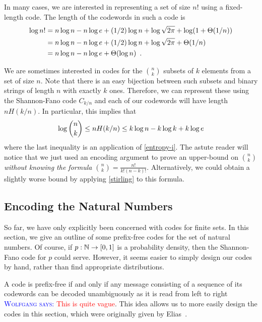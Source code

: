 \documentclass{patmorin}
\newcommand{\aremark}[3]{\textcolor{blue}{\textsc{#1 #2:}}
  \textcolor{red}{\textsf{#3}}}
\newcommand{\wolfgang}[2][says]{\aremark{Wolfgang}{#1}{#2}}
\begin{document}
In many cases, we are interested in representing a set of size $n!$
using a fixed-length code.  The length of the codewords in such a code
is
\begin{align}
  \log n!
  & = n\log n - n\log e + (1/2)\log n + \log \sqrt{2 \pi} + \log(1+\Theta(1/n)) \notag \\
  & = n\log n - n\log e + (1/2)\log n + \log \sqrt{2 \pi} + \Theta(1/n) \notag \\
  & = n\log n - n\log e + \Theta(\log n) \eqlabel{stirling-loose}
    \enspace .
\end{align}

We are sometimes interested in codes for the $\binom{n}{k}$ subsets of
$k$ elements from a set of size $n$. Note that there is an easy
bijection between such subsets and binary strings of length $n$ with
exactly $k$ ones. Therefore, we can represent these using the
Shannon-Fano code $C_{k/n}$ and each of our codewords will have length
$nH(k/n)$.  In particular, this implies that
\begin{equation}
  \log\binom{n}{k} \le nH(k/n) \le k\log n - k\log k + k\log e 
  \eqlabel{log-n-choose-k}
\end{equation}
where the last inequality is an application of \eqref{entropy-i}. The
astute reader will notice that we just used an encoding argument to
prove an upper-bound on $\binom{n}{k}$ \emph{without knowing the 
formula $\binom{n}{k}=\frac{n!}{k! (n - k)!}$}. Alternatively, we 
could obtain a slightly worse bound by applying 
\eqref{stirling} to this formula.

\subsection{Encoding the Natural Numbers}

So far, we have only explicitly been concerned with codes for finite
sets. In this section, we give an outline of some
prefix-free codes for the set of natural numbers. Of course, if $p :
\mathbb{N} \to [0, 1]$ is a probability density, then the Shannon-Fano code
for $p$ could serve. However, it seems easier to simply design our
codes by hand, rather than find appropriate distributions.

A code is prefix-free if and only if any message consisting of a
sequence of its codewords can be decoded unambiguously as it is read
from left to right \wolfgang{This is quite vague}. 
This idea allows us to more easily design the
codes in this section, which were originally given by
Elias~\cite{elias:coding}.
\end{document}
